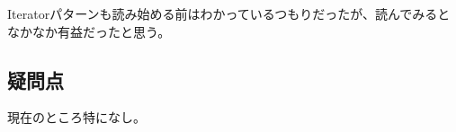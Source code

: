 \documentclass{jsarticle}
\begin{document}
			Iteratorパターンも読み始める前はわかっているつもりだったが、読んでみるとなかなか有益だったと思う。
		\subsection{疑問点}
			現在のところ特になし。
			\clearpage
			
			
			
			
			
			
			
			
			
			
			
			
			
			
			
			
			
			
			
			
			
			
			
			
			
			
			
			
			
			
			
			
			
			
			
		
\end{document}
